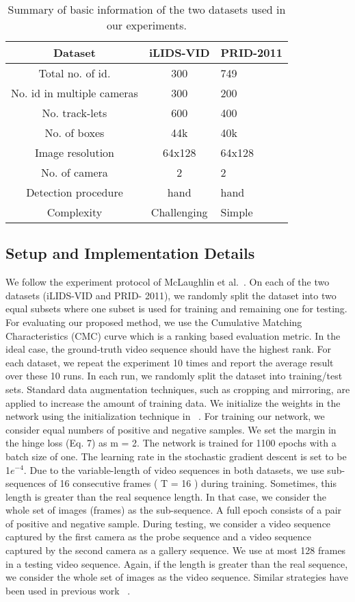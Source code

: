 \documentclass[sigconf, authordraft,review=false]{acmart}
\begin{document}
\begin{table}[h]
  \caption{Summary of basic information of the two datasets used
in our experiments.}
  \label{tab:freq}
  \begin{tabular}{ccl}
    \toprule
    Dataset&iLIDS-VID&PRID-2011\\
    \midrule
    Total no. of id. & 300& 749\\
    No. id in multiple cameras & 300& 200\\
    No. track-lets & 600 & 400\\
    No. of boxes & 44k& 40k\\
    Image resolution & 64x128& 64x128\\
    No. of camera & 2& 2\\
    Detection procedure & hand& hand\\
    Complexity & Challenging& Simple\\
  \bottomrule
\end{tabular}
\end{table}\subsection{ Setup and Implementation Details}
We follow the experiment protocol of McLaughlin
et al.~\cite{mclaughlin16_cvpr}.  On each of the two datasets (iLIDS-VID and PRID-
2011), we randomly split the dataset into two equal subsets
where one subset is used for training and remaining one for
testing.   For evaluating  our proposed  method,  we use  the
Cumulative Matching Characteristics (CMC) curve which
is a ranking based evaluation metric.  In the ideal case, the
ground-truth video sequence should have the highest rank.
For each dataset, we repeat the experiment 10 times and report the average result over these 10 runs.  In each run, we
randomly split the dataset into training/test sets.  
Standard
data  augmentation  techniques,  such  as  cropping  and  mirroring, are applied to increase the amount of training data.
We initialize the weights in the network using the initialization technique in ~\cite{he15_iccv}. For training our network, we consider
equal numbers of positive and negative samples. We set the
margin in the hinge loss (Eq. 7) as m = 2.  The network
is trained for 1100 epochs with a batch size of one.   The
learning rate in the stochastic gradient descent is set to be 1$e^{-4}$. Due to
the variable-length of video sequences in both datasets, we
use sub-sequences of 16 consecutive frames (
T
= 16
) during training. Sometimes, this length is greater than the real
sequence length.  In that case, we consider the whole set of
images (frames) as the sub-sequence. A full epoch consists of a pair of positive and negative sample. 
 During testing,
we consider a video sequence captured by the first camera
as the probe sequence and a video sequence captured by the
second camera as a gallery sequence.  We use at most 128
frames in a testing video sequence.  Again, if the length is
greater than the real sequence, we consider the whole set of
images as the video sequence. Similar strategies have been
used in previous work ~\cite{mclaughlin16_cvpr}.
\end{document}
